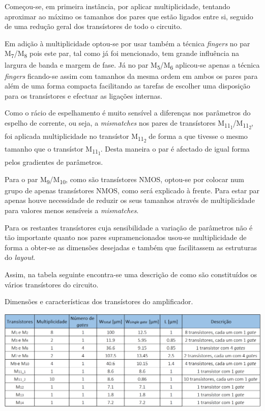 \documentclass[11pt]{article}
\numberwithin{equation}{section}
\begin{document}
Começou-se, em primeira instância, por aplicar multiplicidade, tentando aproximar ao máximo os tamanhos dos pares que estão ligados entre si, seguido de uma redução geral dos transístores de todo o circuito. 

Em adição à multiplicidade optou-se por usar também a técnica \textit{fingers} no par M\textsubscript{7}/M\textsubscript{8} pois este par, tal como já foi mencionado, tem grande influência na largura de banda e margem de fase. Já no par M\textsubscript{5}/M\textsubscript{6} aplicou-se apenas a técnica \textit{fingers} ficando-se assim com tamanhos da mesma ordem em ambos os pares para além de uma forma compacta facilitando as tarefas de escolher uma disposição para os transístores e efectuar as ligações internas.

Como o rácio de espelhamento é muito sensível a diferenças nos parâmetros do espelho de corrente, ou seja, a \textit{mismatches} nos pares de transístores M\textsubscript{11\textsubscript{1}}/M\textsubscript{11\textsubscript{2}}, foi aplicada multiplicidade no transístor M\textsubscript{11\textsubscript{2}} de forma a que tivesse o mesmo tamanho que o transístor M\textsubscript{11\textsubscript{1}}. Desta maneira o par é afectado de igual forma pelos gradientes de parâmetros.

Para o par M\textsubscript{9}/M\textsubscript{10}, como são transístores NMOS, optou-se por colocar num grupo de apenas transístores NMOS, como será explicado à frente. Para estar par apenas houve necessidade de reduzir os seus tamanhos através de multiplicidade para valores menos sensíveis a \textit{mismatches}.

Para os restantes transístores cuja sensibilidade a variação de parâmetros não é tão importante quanto nos pares supramencionados usou-se multiplicidade de forma a obter-se as dimensões desejadas e também que facilitassem as estruturas do \textit{layout}.

Assim, na tabela seguinte encontra-se uma descrição de como são constituídos os vários transístores do circuito.

\begin{table}[H]
	\centering
	\caption{Dimensões e características dos transístores do amplificador.}
	\vspace{-1.5mm}
	\includegraphics[keepaspectratio=true, scale=0.30]{teoricas/dimensoes2}
\end{table}
\end{document}
